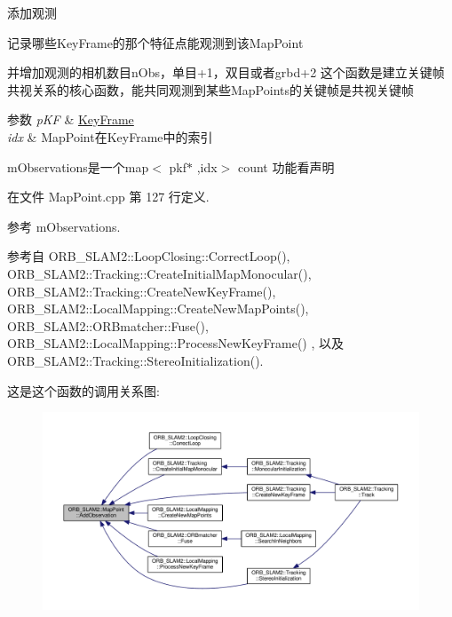 添加观测 

记录哪些\-Key\-Frame的那个特征点能观测到该\-Map\-Point \par
并增加观测的相机数目n\-Obs，单目+1，双目或者grbd+2 这个函数是建立关键帧共视关系的核心函数，能共同观测到某些\-Map\-Points的关键帧是共视关键帧 
\begin{DoxyParams}{参数}
{\em p\-K\-F} & \hyperlink{classORB__SLAM2_1_1KeyFrame}{Key\-Frame} \\
\hline
{\em idx} & Map\-Point在\-Key\-Frame中的索引 \\
\hline
\end{DoxyParams}
m\-Observations是一个map$<$ pkf$\ast$ ,idx$>$ count 功能看声明 

在文件 Map\-Point.\-cpp 第 127 行定义.



参考 m\-Observations.



参考自 O\-R\-B\-\_\-\-S\-L\-A\-M2\-::\-Loop\-Closing\-::\-Correct\-Loop(), O\-R\-B\-\_\-\-S\-L\-A\-M2\-::\-Tracking\-::\-Create\-Initial\-Map\-Monocular(), O\-R\-B\-\_\-\-S\-L\-A\-M2\-::\-Tracking\-::\-Create\-New\-Key\-Frame(), O\-R\-B\-\_\-\-S\-L\-A\-M2\-::\-Local\-Mapping\-::\-Create\-New\-Map\-Points(), O\-R\-B\-\_\-\-S\-L\-A\-M2\-::\-O\-R\-Bmatcher\-::\-Fuse(), O\-R\-B\-\_\-\-S\-L\-A\-M2\-::\-Local\-Mapping\-::\-Process\-New\-Key\-Frame() , 以及 O\-R\-B\-\_\-\-S\-L\-A\-M2\-::\-Tracking\-::\-Stereo\-Initialization().



这是这个函数的调用关系图\-:
\nopagebreak
\begin{figure}[H]
\begin{center}
\leavevmode
\includegraphics[width=350pt]{classORB__SLAM2_1_1MapPoint_a37277ee3c7d8657976e749ab920bb13f_icgraph}
\end{center}
\end{figure}


